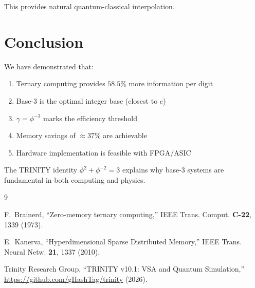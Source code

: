 \documentclass[12pt,a4paper]{article}
\begin{document}
This provides natural quantum-classical interpolation.

\section{Conclusion}

We have demonstrated that:
\begin{enumerate}
\item Ternary computing provides $58.5\%$ more information per digit
\item Base-3 is the optimal integer base (closest to $e$)
\item $\gamma = \phi^{-3}$ marks the efficiency threshold
\item Memory savings of $\approx 37\%$ are achievable
\item Hardware implementation is feasible with FPGA/ASIC
\end{enumerate}

The TRINITY identity $\phi^2 + \phi^{-2} = 3$ explains why base-3 systems are fundamental in both computing and physics.

\begin{thebibliography}{9}

F.~Brainerd,
``Zero-memory ternary computing,''
IEEE Trans. Comput. \textbf{C-22}, 1339 (1973).

E.~Kanerva,
``Hyperdimensional Sparse Distributed Memory,''
IEEE Trans. Neural Netw. \textbf{21}, 1337 (2010).

Trinity Research Group,
``TRINITY v10.1: VSA and Quantum Simulation,''
\url{https://github.com/gHashTag/trinity} (2026).

\end{thebibliography}
\end{document}

